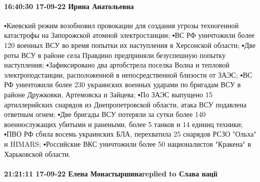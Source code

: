 \paragraph{16:40:30 17-09-22 Ирина Анатольевна}

▪️Киевский режим возобновил провокации для создания угрозы техногенной катастрофы на Запорожской атомной электростанции;
▪️ВС РФ уничтожили более 120 военных ВСУ во время попытки их наступления в Херсонской области;
▪️Две роты ВСУ в районе села Правдино предприняли безуспешную попытку наступления;
▪️Зафиксировано два артобстрела поселка Волна и тепловой электроподстанции, расположенной в непосредственной близости от ЗАЭС;
▪️ВС РФ уничтожили более 230 украинских военных ударами по бригадам ВСУ в районе Дружковки, Артемовска и Зайцева;
▪️По ЗАЭС выпущено 15 артиллерийских снарядов из Днепропетровской области, атака ВСУ подавлена ответным огнем;
▪️Две бригады ВСУ потеряли за сутки более 140 военнослужащих убитыми и ранеными, более 5 танков и 14 единиц техники;
▪️ПВО РФ сбила восемь украинских БЛА, перехватила 25 снарядов РСЗО "Ольха" и HIMARS;
▪️Российские ВКС уничтожили более 50 националистов "Кракена" в Харьковской области.

\paragraph{21:21:11 17-09-22 Елена Монастыршинаreplied to Слава нації}

